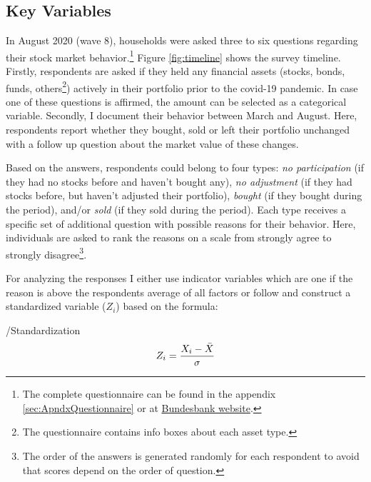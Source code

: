 \documentclass[ProjectABM]{subfiles}
\begin{document}
\subsection{Key Variables}
In August 2020 (wave 8), households were asked three to six questions regarding their stock market behavior.\footnote{The complete questionnaire can be found in the appendix \ref{sec:ApndxQuestionnaire} or at \href{https://www.bundesbank.de/en/bundesbank/research/survey-on-consumer-expectations/questionnaires-850746}{Bundesbank website}.} Figure \ref{fig:timeline} shows the survey timeline. Firstly, respondents are asked if they held any financial assets (stocks, bonds, funds, others\footnote{The questionnaire contains info boxes about each asset type.}) actively in their portfolio prior to the covid-19 pandemic. In case one of these questions is affirmed, the amount can be selected as a categorical variable. Secondly, I document their behavior between March and August. Here, respondents report whether they bought, sold or left their portfolio unchanged with a follow up question about the market value of these changes. %

Based on the answers, respondents could belong to four types: \textit{no participation} (if they had no stocks before and haven't bought any), \textit{no adjustment} (if they had stocks before, but haven't adjusted their portfolio), \textit{bought} (if they bought during the period), and/or \textit{sold} (if they sold during the period). Each type receives a specific set of additional question with possible reasons for their behavior. Here, individuals are asked to rank the reasons on a scale from strongly agree to strongly disagree\footnote{The order of the answers is generated randomly for each respondent to avoid that scores depend on the order of question.}.


For analyzing the responses I either use indicator variables which are one if the reason is above the respondents average of all factors or follow \cite{choi_2020} and construct a standardized variable ($Z_i$) based on the formula:

\begin{verbatimwrite}{\EqDir/Standardization}
	\begin{align}
		Z_i = \frac{X_i - \Bar{X}}{\sigma}  \label{eq:standardization}
	\end{align}
\end{verbatimwrite}

\end{document}
